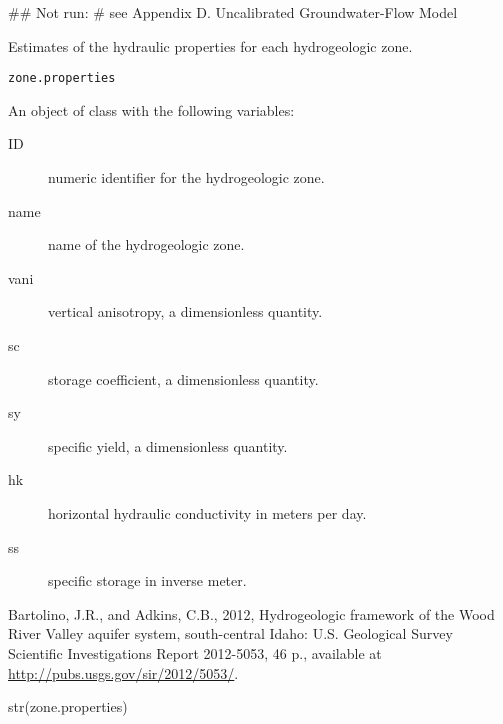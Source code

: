 \documentclass[a4paper]{book}
\begin{document}
%
\begin{Examples}
\begin{ExampleCode}
## Not run: # see Appendix D. Uncalibrated Groundwater-Flow Model

\end{ExampleCode}
\end{Examples}
%
\begin{Description}\relax
Estimates of the hydraulic properties for each hydrogeologic zone.
\end{Description}
%
\begin{Usage}
\begin{verbatim}
zone.properties
\end{verbatim}
\end{Usage}
%
\begin{Format}
An object of  class with the following variables:
\begin{description}

\item[ID] numeric identifier for the hydrogeologic zone.
\item[name] name of the hydrogeologic zone.
\item[vani] vertical anisotropy, a dimensionless quantity.
\item[sc] storage coefficient, a dimensionless quantity.
\item[sy] specific yield, a dimensionless quantity.
\item[hk] horizontal hydraulic conductivity in meters per day.
\item[ss] specific storage in inverse meter.

\end{description}
\end{Format}
%
\begin{References}\relax
Bartolino, J.R., and Adkins, C.B., 2012, Hydrogeologic framework of the
Wood River Valley aquifer system, south-central Idaho:
U.S. Geological Survey Scientific Investigations Report 2012-5053, 46 p.,
available at \url{http://pubs.usgs.gov/sir/2012/5053/}.
\end{References}
%
\begin{Examples}
\begin{ExampleCode}
str(zone.properties)

\end{ExampleCode}
\end{Examples}
\printindex{}
\end{document}
